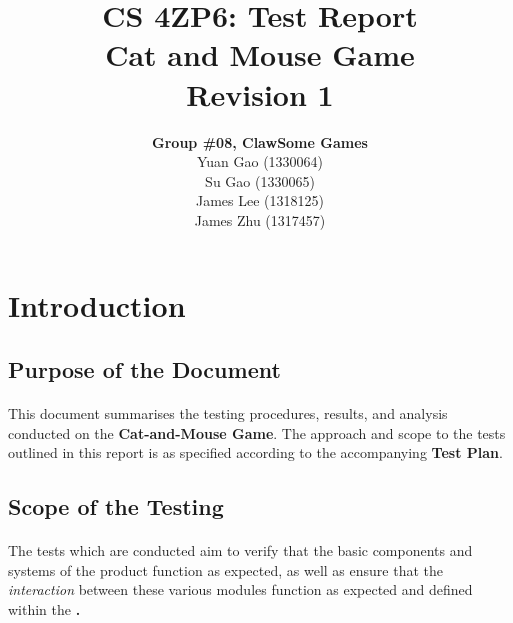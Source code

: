 \documentclass{article}
\title{CS 4ZP6: Test Report
\\Cat and Mouse Game
\\ Revision 1}
\author{\textbf{Group \#08, ClawSome Games}
		\\ Yuan Gao (1330064)
		\\ Su Gao (1330065)
		\\ James Lee (1318125)
		\\ James Zhu (1317457) 
}
\date{\displaydate{date}}
\begin{document}
\maketitle
\newpage
\begin{versionhistory}
\end{versionhistory}

\tableofcontents
\newpage
{}

\section{Introduction}

\subsection{Purpose of the Document}
\paragraph{}This document summarises the testing procedures, results, and analysis conducted on the \textbf{Cat-and-Mouse Game}. The approach and scope to the tests outlined in this report is as specified according to the accompanying \textbf{Test Plan}.

\subsection{Scope of the Testing}
\paragraph{}The tests which are conducted aim to verify that the basic components and systems of the product function as expected, as well as ensure that the \emph{interaction} between these various modules function as expected and defined within the \textbf.
\end{document}
